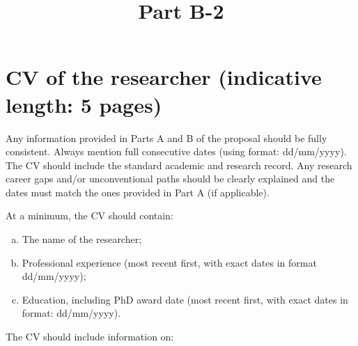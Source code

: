 \documentclass[11pt,draftproposal]{msca-pf}
\title{Part B-2}
\author{}
\date{}
\begin{document}
\maketitle

\section{CV of the researcher (indicative length: 5 pages)}
\label{sc:cv}

Any information provided in Parts A and B of the proposal should be fully consistent.
Always mention full consecutive dates (using format: dd/mm/yyyy). The CV should
include the standard academic and research record. Any research career gaps
and/or unconventional paths should be clearly explained and the dates must match
the ones provided in Part A (if applicable).

At a minimum, the CV should contain:

\begin{enumerate}[a)]
    \item The name of the researcher;
    \item Professional experience (most recent first, with exact dates in format
    dd/mm/yyyy);
    \item Education, including PhD award date (most recent first, with exact
    dates in format: dd/mm/yyyy).
\end{enumerate}

The CV should include information on:
\end{document}
